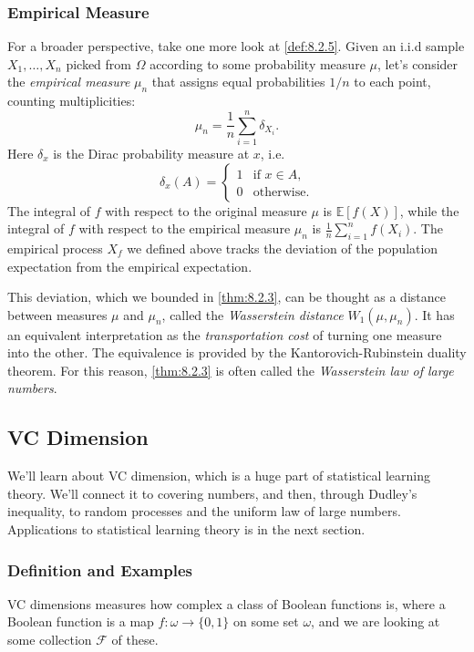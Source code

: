\subsubsection{Empirical Measure}
For a broader perspective, take one more look at \cref{def:8.2.5}. Given an i.i.d sample $X_1, \dots, X_n$ 
picked from $\Omega$ according to some probability measure $\mu$, let's consider the \textit{empirical measure} 
$\mu_n$ that assigns equal probabilities $1/n$ to each point, counting multiplicities:
\[ \mu_n = \frac{1}{n}\sum_{i = 1}^{n} \delta_{X_i}. \]
Here $\delta_x$ is the Dirac probability measure at $x$, i.e.
\[ \delta_x(A) = \begin{cases}
	1 &\text{if } x \in A, \\
	0 &\text{otherwise.}
\end{cases} \]
The integral of $f$ with respect to the original measure $\mu$ is $\mathbb{E}\left[ f(X) \right]$, while the 
integral of $f$ with respect to the empirical measure $\mu_n$ is $\frac{1}{n}\sum_{i = 1}^{n}f(X_i)$. The 
empirical process $X_f$ we defined above tracks the deviation of the population expectation from the empirical 
expectation.

This deviation, which we bounded in \cref{thm:8.2.3}, can be thought as a distance between measures $\mu$ and 
$\mu_n$, called the \textit{Wasserstein distance} $W_1(\mu, \mu_n)$. It has an equivalent interpretation as the 
\textit{transportation cost} of turning one measure into the other. The equivalence is provided by the 
Kantorovich-Rubinstein duality theorem. For this reason, \cref{thm:8.2.3} is often called the 
\textit{Wasserstein law of large numbers}.



\subsection{VC Dimension}
We'll learn about VC dimension, which is a huge part of statistical learning theory. We'll connect it to 
covering numbers, and then, through Dudley's inequality, to random processes and the uniform law of large 
numbers. Applications to statistical learning theory is in the next section.

\subsubsection{Definition and Examples}
VC dimensions measures how complex a class of Boolean functions is, where a Boolean function is a map 
$f: \omega \to \{0, 1\}$ on some set $\omega$, and we are looking at some collection $\mathcal{F}$ of these.

